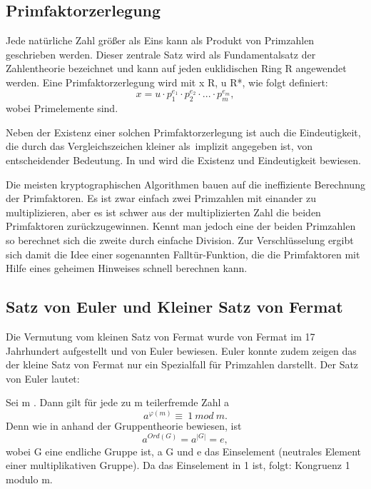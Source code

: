 	\subsection{Primfaktorzerlegung}
	Jede natürliche Zahl größer als Eins kann als Produkt von Primzahlen geschrieben werden. Dieser zentrale Satz wird als Fundamentalsatz der Zahlentheorie bezeichnet und kann auf jeden euklidischen Ring R angewendet werden. Eine Primfaktorzerlegung wird mit x \myin R, u \myin R*,  \myin {} wie folgt definiert:	
	\begin{displaymath}
		x = u \cdot p^{e_1}_1 \cdot p^{e_2}_2 \cdot . . . \cdot p^{e_m}_m,
	\end{displaymath}
	wobei   Primelemente sind.
	

	Neben der Existenz einer solchen Primfaktorzerlegung ist auch die Eindeutigkeit, die durch das Vergleichszeichen \grqq kleiner als\grqq ~implizit angegeben ist, von entscheidender Bedeutung. In \cite{Einfuehrung:in:Algebra:und:Zahlentheorie} und \cite{Algorithmische:Zahlentheorie} wird die Existenz und Eindeutigkeit bewiesen.

	
	Die meisten kryptographischen Algorithmen bauen auf die ineffiziente Berechnung der Primfaktoren. Es ist zwar einfach zwei Primzahlen mit einander zu multiplizieren, aber es ist schwer aus der multiplizierten Zahl die beiden Primfaktoren zurückzugewinnen. Kennt man jedoch eine der beiden Primzahlen so berechnet sich die zweite durch einfache Division. Zur Verschlüsselung ergibt sich damit die Idee einer sogenannten Falltür-Funktion, die die Primfaktoren mit Hilfe eines geheimen Hinweises schnell berechnen kann.
		
	\subsection{Satz von Euler und Kleiner Satz von Fermat}
	Die Vermutung vom kleinen Satz von Fermat wurde von Fermat im 17 Jahrhundert aufgestellt und von Euler bewiesen. Euler konnte zudem zeigen das der kleine Satz von Fermat nur ein Spezialfall für Primzahlen darstellt. Der Satz von Euler lautet:
	
	Sei m  \myin {}. Dann gilt für jede zu m teilerfremde Zahl a \myin {}
	\begin{displaymath}
		a^{\varphi(m)} \equiv~1~mod~m.
	\end{displaymath}
	Denn wie in \cite{Algorithmische:Zahlentheorie} anhand der Gruppentheorie bewiesen, ist
	\begin{displaymath}
		a^{Ord(G)} = a^{|G|} = e,
	\end{displaymath}
	wobei G eine endliche Gruppe ist, a \myin G und e das Einselement (neutrales Element einer multiplikativen Gruppe). Da das Einselement in  1 ist, folgt: Kongruenz 1 modulo m. 
	
